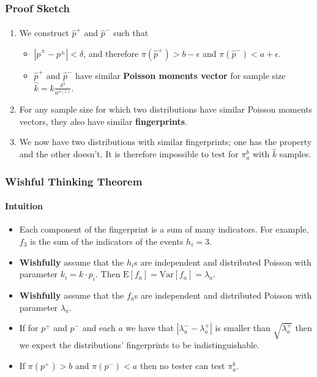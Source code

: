 \documentclass{beamer}
\newcommand{\E}{\mbox{E}} \newcommand{\Cov}{\mbox{Cov}}
\newcommand{\Var}{\mbox{Var}} \newcommand{\Varx}{\mathop{\bf Var\/}}
\begin{document}
\begin{frame}
  \frametitle{Proof Sketch} \framesubtitle{}

  \begin{enumerate}
  \item<2-> We construct $\hat{p}^+$ and $\hat{p}^-$ such that
    \begin{itemize}
    \item<3-> $|\hat{p}^\pm-p^\pm|<\delta$, and therefore
      $\pi(\hat{p}^+)>b-\epsilon$ and $\pi(\hat{p}^-)<a+\epsilon$.
    \item<4->$\hat{p}^+$ and $\hat{p}^-$ have similar {\bf Poisson
        moments vector} for sample size
      $\hat{k}=k\frac{\delta^3}{n^{o(1)}}$.
    \end{itemize}
  \item<5-> For any sample size for which two distributions have similar
    Poisson moments vectors, they also have similar {\bf fingerprints}. 
  \item<6-> We now have two distributions with similar fingerprints;
    one has the property and the other doesn't. It is therefore
    impossible to test for $\pi_a^b$ with $\hat{k}$ samples.
  \end{enumerate}
\end{frame}


\begin{frame}
  \frametitle{Wishful Thinking Theorem} \framesubtitle{Intuition}

  \begin{block}{}
    \begin{itemize}
    \item<1-> Each component of the fingerprint is a sum of many
      indicators. For example, $f_3$ is the sum of the indicators of
      the events $h_i=3$.
    \item<2-> {\bf Wishfully} assume that the $h_i$s are independent
      and distributed Poisson with parameter $k_i=k\cdot p_i$. Then
      $\E[f_a]=\Var[f_a]=\lambda_a$.
    \item<3-> {\bf Wishfully} assume that the $f_a$s are independent
      and distributed Poisson with parameter $\lambda_a$.
    \item<4-> If for $p^+$ and $p^-$ and each $a$ we have that
      $|\lambda^-_a-\lambda^+_a|$ is smaller than $\sqrt{\lambda^+_a}$
      then we expect the distributions' fingerprints to be
      indistinguishable.
    \item<5-> If $\pi(p^+)>b$ and $\pi(p^-)<a$ then no tester can test
      $\pi_a^b$.
    \end{itemize}
  \end{block}
\end{frame}
\end{document}
